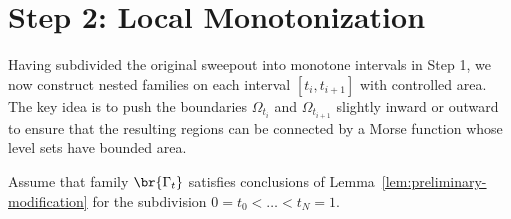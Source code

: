 \section{Step 2: Local Monotonization}\label{sec:local-monotonization}

Having subdivided the original sweepout into monotone intervals in Step 1, we now construct nested
families on each interval $[t_i, t_{i+1}]$ with controlled area. The key idea is to push the
boundaries $\Omega_{t_i}$ and $\Omega_{t_{i+1}}$ slightly inward or outward to ensure that the
resulting regions can be connected by a Morse function whose level sets have bounded area.

Assume that family $\br{\Gamma_t}$ satisfies conclusions of Lemma~\ref{lem:preliminary-modification} for the subdivision $0 = t_0 < \dots < t_N = 1$.

